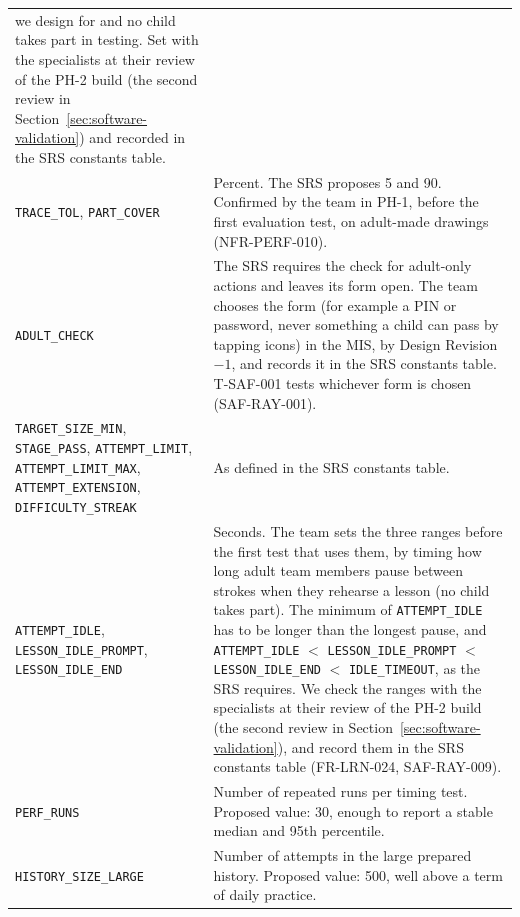 \documentclass[12pt, titlepage]{article}
\begin{document}
{\begin{longtable}{@{}>{\raggedright\arraybackslash}p{}>{\raggedright\arraybackslash}p{}@{}}
we design for and no child takes part in testing. Set with the specialists at
their review of the PH-2 build (the second review in
Section~\ref{sec:software-validation}) and recorded in the SRS constants table.\\
\addlinespace
\texttt{TRACE\_TOL}, \texttt{PART\_COVER} & Percent. The SRS proposes 5 and
90. Confirmed by the team in PH-1, before the first evaluation test, on
adult-made drawings (NFR-PERF-010).\\
\addlinespace
\texttt{ADULT\_CHECK} & The SRS requires the check for adult-only actions and
leaves its form open. The team chooses the form (for example a PIN or password,
never something a child can pass by tapping icons) in the MIS, by Design
Revision~$-1$, and records it in the SRS constants table. T-SAF-001 tests
whichever form is chosen (SAF-RAY-001).\\
\addlinespace
\texttt{TARGET\_SIZE\_MIN}, \texttt{STAGE\_PASS},
\texttt{ATTEMPT\_LIMIT}, \texttt{ATTEMPT\_LIMIT\_MAX},
\texttt{ATTEMPT\_EXTENSION}, \texttt{DIFFICULTY\_STREAK} & As defined in the SRS constants table.\\
\addlinespace
\texttt{ATTEMPT\_IDLE}, \texttt{LESSON\_IDLE\_PROMPT}, \texttt{LESSON\_IDLE\_END} & Seconds. The team sets
the three ranges before the first test that uses them, by timing how long adult team
members pause between strokes when they rehearse a lesson (no child takes part).
The minimum of \texttt{ATTEMPT\_IDLE} has to be longer than the longest
pause, and \texttt{ATTEMPT\_IDLE} $<$ \texttt{LESSON\_IDLE\_PROMPT} $<$
\texttt{LESSON\_IDLE\_END} $<$ \texttt{IDLE\_TIMEOUT}, as the SRS requires. We check the ranges with the
specialists at their review of the PH-2 build (the second review in
Section~\ref{sec:software-validation}), and record them in the SRS constants table (FR-LRN-024, SAF-RAY-009).\\
\addlinespace
\texttt{PERF\_RUNS} & Number of repeated runs per timing test.
Proposed value: 30, enough to report a stable median and 95th percentile.\\
\addlinespace
\texttt{HISTORY\_SIZE\_LARGE} & Number of attempts in the large prepared
history. Proposed value: 500, well above a term of daily practice.\\
\bottomrule
\end{longtable}}
\end{document}
